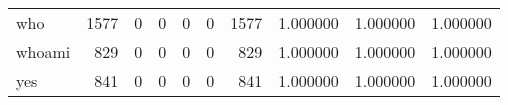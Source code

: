 \begin{longtable}{lrrrrrrrrr}
who       &                                1577 &                                               0 &                                              0 &                                             0 &                                              0 &                                         1577 &                                           1.000000 &                               1.000000 &                             1.000000 \\
whoami    &                                 829 &                                               0 &                                              0 &                                             0 &                                              0 &                                          829 &                                           1.000000 &                               1.000000 &                             1.000000 \\
yes       &                                 841 &                                               0 &                                              0 &                                             0 &                                              0 &                                          841 &                                           1.000000 &                               1.000000 &                             1.000000 \\
\end{longtable}
